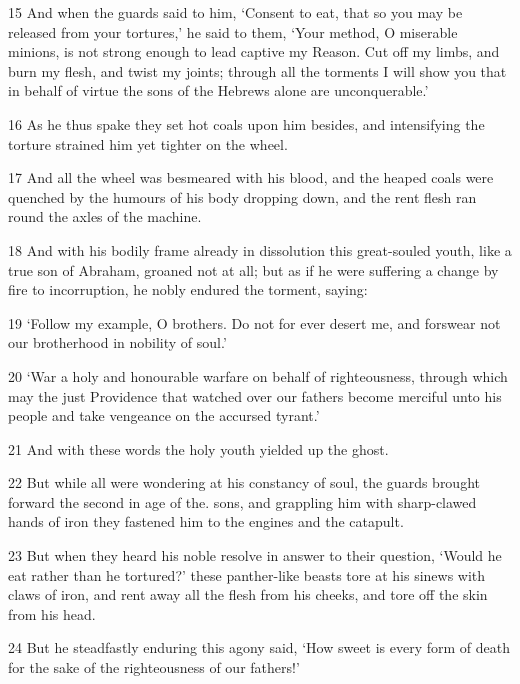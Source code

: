 \par 15 And when the guards said to him, ‘Consent to eat, that so you may be released from your tortures,’ he said to them, ‘Your method, O miserable minions, is not strong enough to lead captive my Reason. Cut off my limbs, and burn my flesh, and twist my joints; through all the torments I will show you that in behalf of virtue the sons of the Hebrews alone are unconquerable.’

\par 16 As he thus spake they set hot coals upon him besides, and intensifying the torture strained him yet tighter on the wheel.

\par 17 And all the wheel was besmeared with his blood, and the heaped coals were quenched by the humours of his body dropping down, and the rent flesh ran round the axles of the machine.

\par 18 And with his bodily frame already in dissolution this great-souled youth, like a true son of Abraham, groaned not at all; but as if he were suffering a change by fire to incorruption, he nobly endured the torment, saying:

\par 19 ‘Follow my example, O brothers. Do not for ever desert me, and forswear not our brotherhood in nobility of soul.’

\par 20 ‘War a holy and honourable warfare on behalf of righteousness, through which may the just Providence that watched over our fathers become merciful unto his people and take vengeance on the accursed tyrant.’

\par 21 And with these words the holy youth yielded up the ghost.

\par 22 But while all were wondering at his constancy of soul, the guards brought forward the second in age of the. sons, and grappling him with sharp-clawed hands of iron they fastened him to the engines and the catapult.

\par 23 But when they heard his noble resolve in answer to their question, ‘Would he eat rather than he tortured?’ these panther-like beasts tore at his sinews with claws of iron, and rent away all the flesh from his cheeks, and tore off the skin from his head.

\par 24 But he steadfastly enduring this agony said, ‘How sweet is every form of death for the sake of the righteousness of our fathers!’

